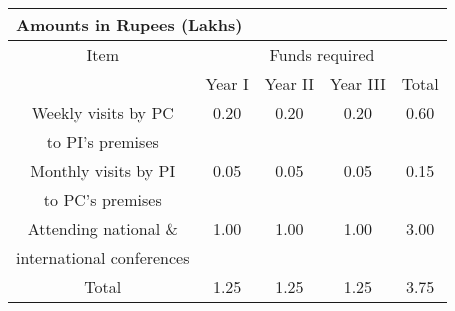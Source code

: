\documentclass[12pt]{article}
\begin{document}
\begin{center}
\begin{tabular}{|c|c|c|c|c|}
\multicolumn{5}{l}{\bf Amounts in Rupees (Lakhs)}\\
\hline
Item & \multicolumn{4}{c|}{Funds required} \\
\cline{2-5}
 & Year I & Year II & Year III & Total \\
\hline
Weekly visits by PC & 0.20 & 0.20 & 0.20 & 0.60 \\
to PI's premises & & & & \\
Monthly visits by PI & 0.05 & 0.05 & 0.05 & 0.15 \\
to PC's premises & & & & \\
Attending national \& & 1.00 & 1.00 & 1.00 & 3.00 \\
international conferences & & & & \\
\hline
Total & 1.25 & 1.25 & 1.25 & 3.75 \\
\hline
\end{tabular}
\end{center}











\end{document}
